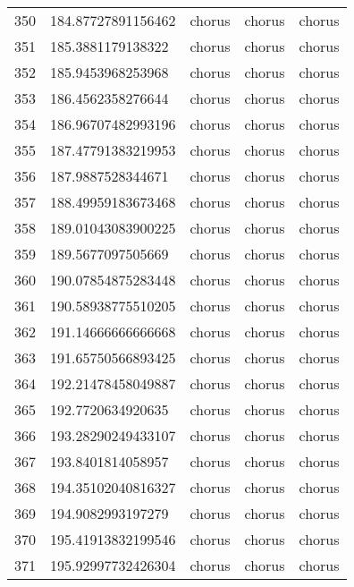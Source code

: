 \begin{table}[]
\begin{tabular}{lllll}
    350  & 184.87727891156462 & chorus       & chorus          & chorus         \\
    351  & 185.3881179138322  & chorus       & chorus          & chorus         \\
    352  & 185.9453968253968  & chorus       & chorus          & chorus         \\
    353  & 186.4562358276644  & chorus       & chorus          & chorus         \\
    354  & 186.96707482993196 & chorus       & chorus          & chorus         \\
    355  & 187.47791383219953 & chorus       & chorus          & chorus         \\
    356  & 187.9887528344671  & chorus       & chorus          & chorus         \\
    357  & 188.49959183673468 & chorus       & chorus          & chorus         \\
    358  & 189.01043083900225 & chorus       & chorus          & chorus         \\
    359  & 189.5677097505669  & chorus       & chorus          & chorus         \\
    360  & 190.07854875283448 & chorus       & chorus          & chorus         \\
    361  & 190.58938775510205 & chorus       & chorus          & chorus         \\
    362  & 191.14666666666668 & chorus       & chorus          & chorus         \\
    363  & 191.65750566893425 & chorus       & chorus          & chorus         \\
    364  & 192.21478458049887 & chorus       & chorus          & chorus         \\
    365  & 192.7720634920635  & chorus       & chorus          & chorus         \\
    366  & 193.28290249433107 & chorus       & chorus          & chorus         \\
    367  & 193.8401814058957  & chorus       & chorus          & chorus         \\
    368  & 194.35102040816327 & chorus       & chorus          & chorus         \\
    369  & 194.9082993197279  & chorus       & chorus          & chorus         \\
    370  & 195.41913832199546 & chorus       & chorus          & chorus         \\
    371  & 195.92997732426304 & chorus       & chorus          & chorus         \\

\end{tabular}
\end{table}
